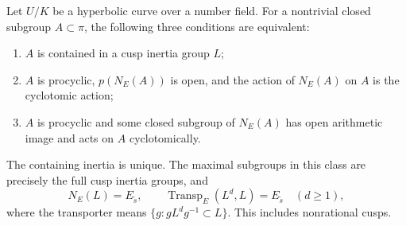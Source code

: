 \begin{proposition}
\label{A:cyclotomic-normalizer}
Let $U/K$ be a hyperbolic curve over a number field.  For a
nontrivial closed subgroup $A\subset\pi$, the following three
conditions are equivalent:
\begin{enumerate}
\item $A$ is contained in a cusp inertia group $L$;
\item $A$ is procyclic, $p(N_E(A))$ is open, and the action
of $N_E(A)$ on $A$ is the cyclotomic action;
\item $A$ is procyclic and some closed subgroup of $N_E(A)$
has open arithmetic image and acts on $A$ cyclotomically.
\end{enumerate}
The containing inertia is unique.  The maximal subgroups in
this class are precisely the full cusp inertia groups, and
\[
 N_E(L)=E_{\widetilde s},\qquad
 \operatorname{Transp}_E(L^d,L)=E_{\widetilde s}\quad(d\geq1),
                                                               \tag{A7}
\]
where the transporter means $\{g:gL^dg^{-1}\subset L\}$.
This includes nonrational cusps.
\end{proposition}
